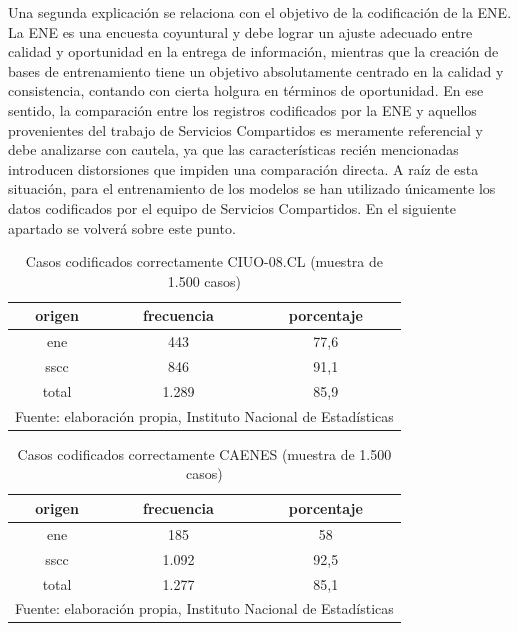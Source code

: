 \documentclass[
  12pt,
  spanish,
]{article}
\begin{document}
Una segunda explicación se relaciona con el objetivo de la codificación
de la ENE. La ENE es una encuesta coyuntural y debe lograr un ajuste
adecuado entre calidad y oportunidad en la entrega de información,
mientras que la creación de bases de entrenamiento tiene un objetivo
absolutamente centrado en la calidad y consistencia, contando con cierta
holgura en términos de oportunidad. En ese sentido, la comparación entre
los registros codificados por la ENE y aquellos provenientes del trabajo
de Servicios Compartidos es meramente referencial y debe analizarse con
cautela, ya que las características recién mencionadas introducen
distorsiones que impiden una comparación directa. A raíz de esta
situación, para el entrenamiento de los modelos se han utilizado
únicamente los datos codificados por el equipo de Servicios Compartidos.
En el siguiente apartado se volverá sobre este punto.

\begin{table}[H]

\caption{\label{tab:mostrar_tabla_audi_final}\label{ciuo_audi_final}Casos codificados correctamente CIUO-08.CL (muestra de 1.500 casos)}
\centering
\fontsize{9.5}{11.5}\selectfont
\begin{tabular}[t]{ccc}
\toprule
origen & frecuencia & porcentaje\\
\midrule
ene & 443 & 77,6\\
sscc & 846 & 91,1\\
total & 1.289 & 85,9\\
\bottomrule
\multicolumn{3}{l}{\rule{0pt}{1em}Fuente: elaboración propia, Instituto Nacional de Estadísticas }\\
\end{tabular}
\end{table}

\begin{table}[H]

\caption{\label{tab:mostrar_tabla_audi_final}\label{caenes_audi_final}Casos codificados correctamente CAENES (muestra de 1.500 casos)}
\centering
\fontsize{9.5}{11.5}\selectfont
\begin{tabular}[t]{ccc}
\toprule
origen & frecuencia & porcentaje\\
\midrule
ene & 185 & 58\\
sscc & 1.092 & 92,5\\
total & 1.277 & 85,1\\
\bottomrule
\multicolumn{3}{l}{\rule{0pt}{1em}Fuente: elaboración propia, Instituto Nacional de Estadísticas }\\
\end{tabular}
\end{table}
\end{document}

